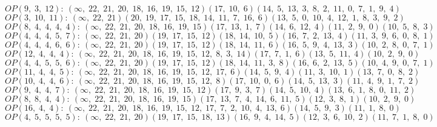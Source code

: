 $OP(9, \;3, \;12): \:(\infty, \;22, \;21, \;20, \;18, \;16, \;19, \;15, \;12)(17, \;10, \;6)(14, \;5, \;13, \;3, \;8, \;2, \;11, \;0, \;7, \;1, \;9, \;4)$\\
$OP(3, \;10, \;11): \:(\infty, \;22, \;21)(20, \;19, \;17, \;15, \;18, \;14, \;11, \;7, \;16, \;6)(13, \;5, \;0, \;10, \;4, \;12, \;1, \;8, \;3, \;9, \;2)$\\
$OP(8, \;4, \;4, \;4, \;4): \:(\infty, \;22, \;21, \;20, \;18, \;16, \;19, \;15)(17, \;13, \;1, \;7)(14, \;6, \;12, \;4)(11, \;2, \;9, \;0)(10, \;5, \;8, \;3)$\\
$OP(4, \;4, \;4, \;5, \;7): \:(\infty, \;22, \;21, \;20)(19, \;17, \;15, \;12)(18, \;14, \;10, \;5)(16, \;7, \;2, \;13, \;4)(11, \;3, \;9, \;6, \;0, \;8, \;1)$\\
$OP(4, \;4, \;4, \;6, \;6): \:(\infty, \;22, \;21, \;20)(19, \;17, \;15, \;12)(18, \;14, \;11, \;6)(16, \;5, \;9, \;4, \;13, \;3)(10, \;2, \;8, \;0, \;7, \;1)$\\
$OP(12, \;4, \;4, \;4): \:(\infty, \;22, \;21, \;20, \;18, \;16, \;19, \;15, \;12, \;8, \;3, \;14)(17, \;7, \;1, \;6)(13, \;5, \;11, \;4)(10, \;2, \;9, \;0)$\\
$OP(4, \;4, \;5, \;5, \;6): \:(\infty, \;22, \;21, \;20)(19, \;17, \;15, \;12)(18, \;14, \;11, \;3, \;8)(16, \;6, \;2, \;13, \;5)(10, \;4, \;9, \;0, \;7, \;1)$\\
$OP(11, \;4, \;4, \;5): \:(\infty, \;22, \;21, \;20, \;18, \;16, \;19, \;15, \;12, \;17, \;6)(14, \;5, \;9, \;4)(11, \;3, \;10, \;1)(13, \;7, \;0, \;8, \;2)$\\
$OP(10, \;4, \;4, \;6): \:(\infty, \;22, \;21, \;20, \;18, \;16, \;19, \;15, \;12, \;8)(17, \;10, \;0, \;6)(14, \;5, \;13, \;3)(11, \;4, \;9, \;1, \;7, \;2)$\\
$OP(9, \;4, \;4, \;7): \:(\infty, \;22, \;21, \;20, \;18, \;16, \;19, \;15, \;12)(17, \;9, \;3, \;7)(14, \;5, \;10, \;4)(13, \;6, \;1, \;8, \;0, \;11, \;2)$\\
$OP(8, \;8, \;4, \;4): \:(\infty, \;22, \;21, \;20, \;18, \;16, \;19, \;15)(17, \;13, \;7, \;4, \;14, \;6, \;11, \;5)(12, \;3, \;8, \;1)(10, \;2, \;9, \;0)$\\
$OP(16, \;4, \;4): \:(\infty, \;22, \;21, \;20, \;18, \;16, \;19, \;15, \;12, \;17, \;7, \;2, \;10, \;4, \;13, \;6)(14, \;5, \;9, \;3)(11, \;1, \;8, \;0)$\\
$OP(4, \;5, \;5, \;5, \;5): \:(\infty, \;22, \;21, \;20)(19, \;17, \;15, \;18, \;13)(16, \;9, \;4, \;14, \;5)(12, \;3, \;6, \;10, \;2)(11, \;7, \;1, \;8, \;0)$\\
